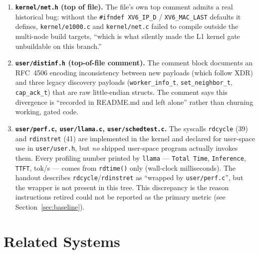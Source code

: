 \documentclass[11pt,a4paper]{article}
\begin{document}
\begin{enumerate}[leftmargin=*]
\item \textbf{\texttt{kernel/net.h} (top of file).}
The file's own top comment admits a real historical bug: without the \texttt{\#ifndef XV6\_IP\_D} / \texttt{XV6\_MAC\_LAST} defaults it defines, \texttt{kernel/e1000.c} and \texttt{kernel/net.c} failed to compile outside the multi-node build targets, ``which is what silently made the L1 kernel gate unbuildable on this branch.''

\item \textbf{\texttt{user/distinf.h} (top-of-file comment).}
The comment block documents an RFC~4506 encoding inconsistency between new payloads (which follow XDR) and three legacy discovery payloads (\texttt{worker\_info\_t}, \texttt{set\_neighbor\_t}, \texttt{cap\_ack\_t}) that are raw little-endian structs. The comment says this divergence is ``recorded in README.md and left alone'' rather than churning working, gated code.

\item \textbf{\texttt{user/perf.c}, \texttt{user/llama.c}, \texttt{user/schedtest.c}.}
The syscalls \texttt{rdcycle} (39) and \texttt{rdinstret} (41) are implemented in the kernel and declared for user-space use in \texttt{user/user.h}, but \emph{no} shipped user-space program actually invokes them. Every profiling number printed by \texttt{llama} --- \texttt{Total Time}, \texttt{Inference}, \texttt{TTFT}, tok/s --- comes from \texttt{rdtime()} only (wall-clock milliseconds). The handout describes \texttt{rdcycle}/\texttt{rdinstret} as ``wrapped by \texttt{user/perf.c}'', but the wrapper is not present in this tree. This discrepancy is the reason instructions retired could not be reported as the primary metric (see Section~\ref{sec:baseline}).

\end{enumerate}

\section{Related Systems}
\end{document}

